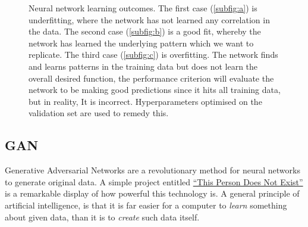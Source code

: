 \documentclass[12pt,a4paper]{article}
\begin{document}
\begin{figure}[h!]
\caption{Neural network learning outcomes. The first case (\ref{subfig:a}) is underfitting, where the network has not learned any correlation in the data. The second case (\ref{subfig:b}) is a good fit, whereby the network has learned the underlying pattern which we want to replicate. The third case (\ref{subfig:c}) is overfitting. The network finds and learns patterns in the training data but does not learn the overall desired function, the performance criterion will evaluate the network to be making good predictions since it hits all training data, but in reality, It is incorrect. Hyperparameters optimised on the validation set are used to remedy this.}
\label{fig:overfitting}
\end{figure}
\pagebreak
\subsection{GAN} \label{subsec:gan}
Generative Adversarial Networks \cite{goodfellow_generative_2014} are a revolutionary method for neural networks to generate original data. A simple project entitled \href{https://thispersondoesnotexist.com}{\enquote{This Person Does Not Exist}} \cite{karras_et_al._this_2019} is a remarkable display of how powerful this technology is. A general principle of artificial intelligence, is that it is far easier for a computer to \emph{learn} something about given data, than it is to \emph{create} such data itself. 
\end{document}
